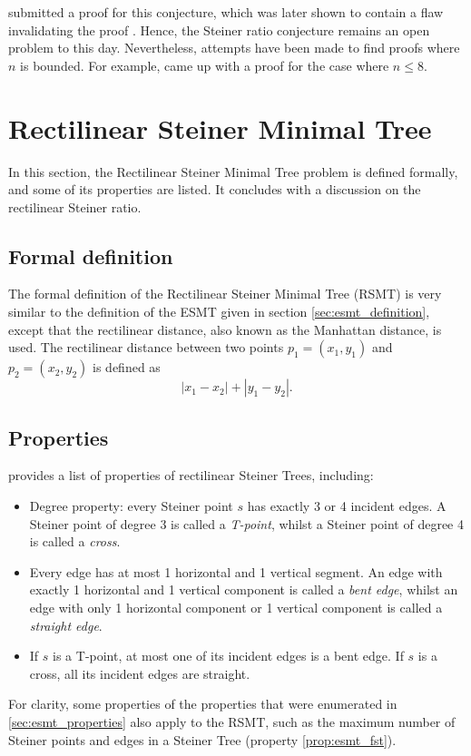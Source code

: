 \documentclass{l4proj}
\begin{document}
\cite{Steiner_ratio_proof} submitted a proof for this conjecture, which was later shown to contain a flaw invalidating the proof \citep{Steiner_ratio_proof_invalidated}. Hence, the Steiner ratio conjecture remains an open problem to this day.
Nevertheless, attempts have been made to find proofs where $n$ is bounded. For example, \cite{Steiner_ratio_proof_8_points} came up with a proof for the case where $n \leq 8$.



\section{Rectilinear Steiner Minimal Tree}
In this section, the Rectilinear Steiner Minimal Tree problem is defined formally, and some of its properties are listed. It concludes with a discussion on the rectilinear Steiner ratio.
\label{sec:rectilinear_smt}
\subsection{Formal definition}
The formal definition of the Rectilinear Steiner Minimal Tree (RSMT) is very similar to the definition of the ESMT given in section \ref{sec:esmt_definition}, except that the rectilinear distance, also known as the Manhattan distance, is used. The rectilinear distance between two points $p_1 = (x_1, y_1)$ and $p_2 = (x_2, y_2)$ is defined as
$$|x_1 - x_2| + |y_1 - y_2|.$$
\subsection{Properties}
\cite{Brazil2015} provides a list of properties of rectilinear Steiner Trees, including:

\begin{itemize}
    \item Degree property: every Steiner point $s$ has exactly 3 or 4 incident edges. A Steiner point of degree 3 is called a \textit{T-point}, whilst a Steiner point of degree 4 is called a \textit{cross}.
    \item Every edge has at most 1 horizontal and 1 vertical segment. An edge with exactly 1 horizontal and 1 vertical component is called a \textit{bent edge}, whilst an edge with only 1 horizontal component or 1 vertical component is called a \textit{straight edge}.
    \item If $s$ is a T-point, at most one of its incident edges is a bent edge. If $s$ is a cross, all its incident edges are straight.
\end{itemize}
\label{sec:rsmt_properties}
For clarity, some properties of the properties that were enumerated in \ref{sec:esmt_properties} also apply to the RSMT, such as the maximum number of Steiner points and edges in a Steiner Tree (property \ref{prop:esmt_fst}).
\end{document}
